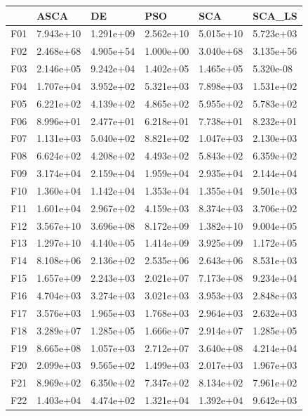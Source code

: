 \begin{tabular}{llllll}
\toprule
{} &       ASCA &         DE &        PSO &        SCA &     SCA\_LS \\
\midrule
F01  &  7.943e+10 &  1.291e+09 &  2.562e+10 &  5.015e+10 &  5.723e+03 \\
F02  &  2.468e+68 &  4.905e+54 &  1.000e+00 &  3.040e+68 &  3.135e+56 \\
F03  &  2.146e+05 &  9.242e+04 &  1.402e+05 &  1.465e+05 &  5.320e-08 \\
F04  &  1.707e+04 &  3.952e+02 &  5.321e+03 &  7.898e+03 &  1.531e+02 \\
F05  &  6.221e+02 &  4.139e+02 &  4.865e+02 &  5.955e+02 &  5.783e+02 \\
F06  &  8.996e+01 &  2.477e+01 &  6.218e+01 &  7.738e+01 &  8.232e+01 \\
F07  &  1.131e+03 &  5.040e+02 &  8.821e+02 &  1.047e+03 &  2.130e+03 \\
F08  &  6.624e+02 &  4.208e+02 &  4.493e+02 &  5.843e+02 &  6.359e+02 \\
F09  &  3.174e+04 &  2.159e+04 &  1.959e+04 &  2.935e+04 &  2.144e+04 \\
F10  &  1.360e+04 &  1.142e+04 &  1.353e+04 &  1.355e+04 &  9.501e+03 \\
F11  &  1.601e+04 &  2.967e+02 &  4.159e+03 &  8.374e+03 &  3.706e+02 \\
F12  &  3.567e+10 &  3.696e+08 &  8.172e+09 &  1.382e+10 &  9.004e+05 \\
F13  &  1.297e+10 &  4.140e+05 &  1.414e+09 &  3.925e+09 &  1.172e+05 \\
F14  &  8.108e+06 &  2.136e+02 &  2.535e+06 &  2.643e+06 &  8.531e+03 \\
F15  &  1.657e+09 &  2.243e+03 &  2.021e+07 &  7.173e+08 &  9.234e+04 \\
F16  &  4.704e+03 &  3.274e+03 &  3.021e+03 &  3.953e+03 &  2.848e+03 \\
F17  &  3.576e+03 &  1.965e+03 &  1.768e+03 &  2.964e+03 &  2.632e+03 \\
F18  &  3.289e+07 &  1.285e+05 &  1.666e+07 &  2.914e+07 &  1.285e+05 \\
F19  &  8.665e+08 &  1.057e+03 &  2.712e+07 &  3.640e+08 &  4.214e+04 \\
F20  &  2.099e+03 &  9.565e+02 &  1.499e+03 &  2.017e+03 &  1.967e+03 \\
F21  &  8.969e+02 &  6.350e+02 &  7.347e+02 &  8.134e+02 &  7.961e+02 \\
F22  &  1.403e+04 &  4.474e+02 &  1.321e+04 &  1.392e+04 &  9.642e+03 \\

\end{tabular}
